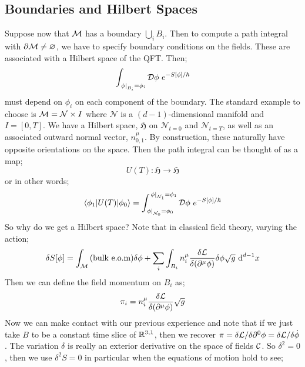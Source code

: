 \subsection{Boundaries and Hilbert Spaces}
Suppose now that $\mathcal{M}$ has a boundary $\bigcup_i B_i$. Then to compute a path integral with $\partial \mathcal{M} \neq \varnothing$, we have to specify boundary conditions on the fields. These are associated with a Hilbert space of the QFT. Then;
\begin{equation}
\int_{\left.\phi\right|_{B_i} = \phi_i}{\mD\phi\,\, e^{-S[\phi]/\hbar}}
\end{equation}
must depend on $\phi_i$ on each component of the boundary. The standard example to choose is $\mathcal{M} = \mathcal{N}\times I$ where $\mathcal{N}$ is a $(d-1)$-dimensional manifold and $I = \left[0, T\right]$. We have a Hilbert space, $\mathfrak{H}$ on $\mathcal{N}_{t = 0}$ and $\mathcal{N}_{t = T}$, as well as an associated outward normal vector, $n^\mu_{0, 1}$. By construction, these naturally have opposite orientations on the space. Then the path integral can be thought of as a map;
\begin{equation}
U(T) : \mathfrak{H} \rightarrow \mathfrak{H}
\end{equation}
or in other words;
\begin{equation}
\bra{\phi_{1}}U(T)\ket{\phi_0} = \int_{\left.\phi\right|_{\mathcal{N}_0} = \phi_0}^{\left.\phi\right|_{\mathcal{N}_1} = \phi_1}{\mD\phi \,\,e^{-S[\phi]/\hbar}}
\end{equation}
So why do we get a Hilbert space? Note that in classical field theory, varying the action;
\begin{equation}
\delta S[\phi] = \int_{\mathcal{M}}{(\text{bulk e.o.m})\delta \phi} + \sum_{i}{\int_{B_i}{n^\mu_i \frac{\delta \mathcal{L}}{\delta(\partial^\mu \phi)}\delta \phi \sqrt{g}\,\,\text{d}^{d-1} x}}
\end{equation}
Then we can define the field momentum on $B_i$ as;
\begin{equation}
\pi_i = n^\mu_i \frac{\delta \mathcal{L}}{\delta(\partial^\mu \phi)}\sqrt{g}
\end{equation}
Now we can make contact with our previous experience and note that if we just take $B$ to be a constant time slice of $\mathbb{R}^{3, 1}$, then we recover $\pi = \delta \mathcal{L}/\delta\partial^0 \phi = \delta \mathcal{L}/\delta \dot{\phi}$. The variation $\delta$ is really an exterior derivative on the space of fields $\mathcal{C}$. So $\delta^2 = 0$, then we use $\delta^2 S = 0$ in particular when the equations of motion hold to see;
